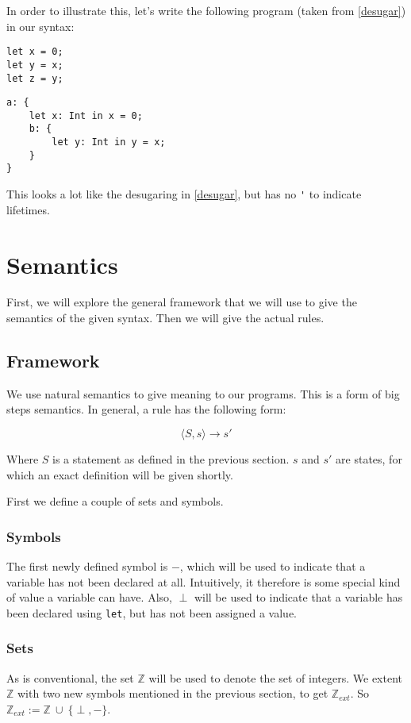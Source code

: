 In order to illustrate this, let's write the following program (taken from \ref{desugar}) in our syntax: 

\begin{verbatim}
let x = 0;
let y = x;
let z = y;
\end{verbatim}

\begin{verbatim}
a: {
    let x: Int in x = 0;
    b: {
        let y: Int in y = x;
    }
}
\end{verbatim}

This looks a lot like the desugaring in \ref{desugar}, but has no \verb|'| to indicate lifetimes. 
 

\section{Semantics}
First, we will explore the general framework that we will use to give the semantics of the given syntax. Then we will give the actual rules. 

\subsection{Framework}
We use natural semantics to give meaning to our programs. This is a form of big steps semantics. In general, a rule has the following form:

$$\langle S, s \rangle \to s'$$

Where $S$ is a statement as defined in the previous section. $s$ and $s'$ are states, for which an exact definition will be given shortly. 

First we define a couple of sets and symbols.  

\subsubsection{Symbols}
The first newly defined symbol is $-$, which will be used to indicate that a variable has not been declared at all. Intuitively, it therefore is some special kind of value a variable can have. Also, $\perp$ will be used to indicate that a variable has been declared using \verb|let|, but has not been assigned a value.

\subsubsection{Sets}
As is conventional, the set $\mathbb{Z}$ will be used to denote the set of integers. We extent $\mathbb{Z}$ with two new symbols mentioned in the previous section, to get $\mathbb{Z}_{ext}$. So $\mathbb{Z}_{ext} := \mathbb{Z} ~\cup ~ \{\perp, -\}$.

